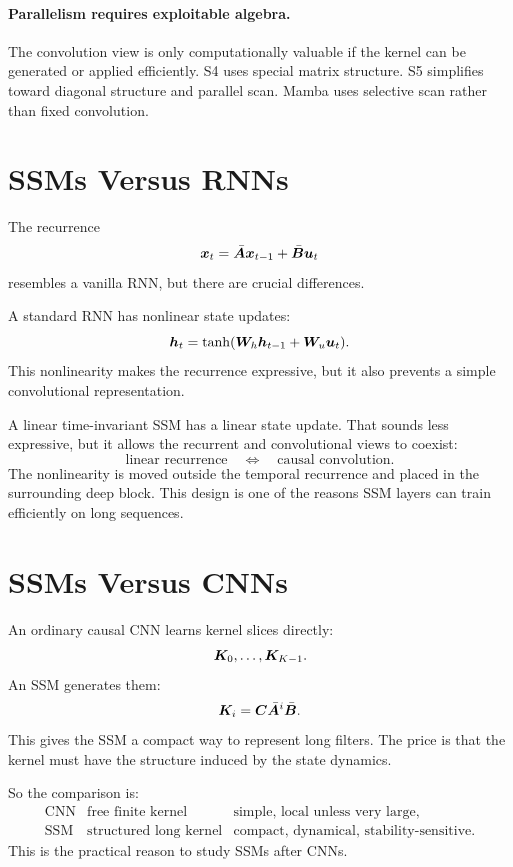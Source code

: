 \paragraph{Parallelism requires exploitable algebra.}
The convolution view is only computationally valuable if the kernel can be generated or
applied efficiently. S4 uses special matrix structure. S5 simplifies toward diagonal
structure and parallel scan. Mamba uses selective scan rather than fixed convolution.

\section{SSMs Versus RNNs}

The recurrence
\[
  \bm{x}_t = \bar{\bm{A}}\bm{x}_{t-1}+\bar{\bm{B}}\bm{u}_t
\]
resembles a vanilla RNN, but there are crucial differences.

A standard RNN has nonlinear state updates:
\[
  \bm{h}_t = \tanh(\bm{W}_h\bm{h}_{t-1}+\bm{W}_u\bm{u}_t).
\]
This nonlinearity makes the recurrence expressive, but it also prevents a simple
convolutional representation.

A linear time-invariant SSM has a linear state update. That sounds less expressive, but
it allows the recurrent and convolutional views to coexist:
\[
  \text{linear recurrence}
  \quad \Longleftrightarrow \quad
  \text{causal convolution}.
\]
The nonlinearity is moved outside the temporal recurrence and placed in the surrounding
deep block. This design is one of the reasons SSM layers can train efficiently on long
sequences.

\section{SSMs Versus CNNs}

An ordinary causal CNN learns kernel slices directly:
\[
  \bm{K}_0,\ldots,\bm{K}_{K-1}.
\]
An SSM generates them:
\[
  \bm{K}_i = \bm{C}\bar{\bm{A}}^i\bar{\bm{B}}.
\]
This gives the SSM a compact way to represent long filters. The price is that the kernel
must have the structure induced by the state dynamics.

So the comparison is:
\[
\begin{array}{lll}
\text{CNN} & \text{free finite kernel} & \text{simple, local unless very large}, \\
\text{SSM} & \text{structured long kernel} & \text{compact, dynamical, stability-sensitive}.
\end{array}
\]
This is the practical reason to study SSMs after CNNs.

